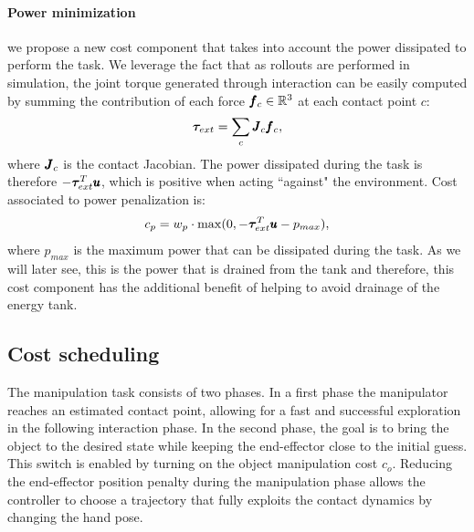 \paragraph{Power minimization} we propose a new cost component that takes into account the power dissipated to perform the task. We leverage the fact that as rollouts are performed in simulation, the joint torque generated through interaction can be easily computed by summing the contribution of each force $\pmb{f}_c \in \mathbb{R}^{3}$ at each contact point $c$:
\begin{equation}
\boldsymbol{\tau}_{ext} = \sum\limits_{c} \pmb{J}_c \pmb{f}_c,    
\end{equation}
where $\pmb{J}_c$ is the contact Jacobian. The power dissipated during the task is therefore $-\boldsymbol{\tau}_{ext}^T\pmb{u}$, which is positive when acting ``against" the environment. Cost associated to power penalization is:
\begin{equation}
   c_p = w_{p} \cdot \max(0, - \boldsymbol{\tau}_{ext}^T\pmb{u} - p_{max}),      
 \end{equation}
where $p_{max}$ is the maximum power that can be dissipated during the task.
As we will later see, this is the power that is drained from the tank and therefore, this cost component has the additional benefit of helping to avoid drainage of the energy tank.


\subsection{Cost scheduling}
The manipulation task consists of two phases. In a first phase the manipulator reaches an estimated contact point, allowing for a fast and successful exploration in the following interaction phase. In the second phase, the goal is to bring the object to the desired state while keeping the end-effector close to the initial guess. This switch is enabled by turning on the object manipulation cost $c_o$. Reducing the end-effector position penalty during the manipulation phase allows the controller to choose a trajectory that fully exploits the contact dynamics by changing the hand pose. 



